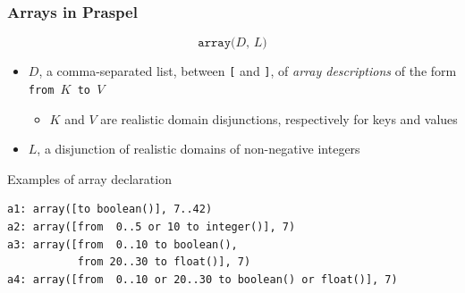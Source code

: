 \documentclass[9pt]{beamer}
\newcommand{\code}[1]{\texttt{#1}}
\begin{document}
\begin{frame}[fragile]
\frametitle{Arrays in Praspel}

$$\code{array($D$, $L$)}$$
\vspace{-1.5em}
\begin{itemize}
\item $D$, a comma-separated list, between \code{[} and \code{]}, of
{\em array descriptions} of the form \code{from $K$ to $V$}
\begin{itemize}
\item $K$ and $V$ are realistic domain disjunctions, respectively for keys and
values
\end{itemize}
\item $L$, a disjunction of realistic domains of non-negative integers
\end{itemize}

\begin{exampleblock}{Examples of array declaration}
\begin{verbatim}
a1: array([to boolean()], 7..42)
a2: array([from  0..5 or 10 to integer()], 7)
a3: array([from  0..10 to boolean(),
           from 20..30 to float()], 7)
a4: array([from  0..10 or 20..30 to boolean() or float()], 7)
\end{verbatim}
\end{exampleblock}

\end{frame}

\end{document}
